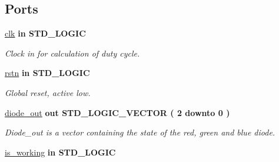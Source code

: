 \subsection*{Ports}
 \begin{DoxyCompactItemize}
\item 
\hypertarget{classRGB__diode__controller_a8120037e0ee47c35ba2d79242209c72e}{\hyperlink{classRGB__diode__controller_a8120037e0ee47c35ba2d79242209c72e}{clk}  {\bfseries {\bfseries \textcolor{vhdlkeyword}{in}\textcolor{vhdlchar}{ }}} {\bfseries \textcolor{comment}{S\-T\-D\-\_\-\-L\-O\-G\-I\-C}\textcolor{vhdlchar}{ }} }\label{classRGB__diode__controller_a8120037e0ee47c35ba2d79242209c72e}

\begin{DoxyCompactList}\small\item\em Clock in for calculation of duty cycle. \end{DoxyCompactList}\item 
\hypertarget{classRGB__diode__controller_aba021aec4b477b89079bb58ccadcc67e}{\hyperlink{classRGB__diode__controller_aba021aec4b477b89079bb58ccadcc67e}{rstn}  {\bfseries {\bfseries \textcolor{vhdlkeyword}{in}\textcolor{vhdlchar}{ }}} {\bfseries \textcolor{comment}{S\-T\-D\-\_\-\-L\-O\-G\-I\-C}\textcolor{vhdlchar}{ }} }\label{classRGB__diode__controller_aba021aec4b477b89079bb58ccadcc67e}

\begin{DoxyCompactList}\small\item\em Global reset, active low. \end{DoxyCompactList}\item 
\hypertarget{classRGB__diode__controller_a0ee3d978fb8b47588b62e4a768c780fe}{\hyperlink{classRGB__diode__controller_a0ee3d978fb8b47588b62e4a768c780fe}{diode\-\_\-out}  {\bfseries {\bfseries \textcolor{vhdlkeyword}{out}\textcolor{vhdlchar}{ }}} {\bfseries \textcolor{comment}{S\-T\-D\-\_\-\-L\-O\-G\-I\-C\-\_\-\-V\-E\-C\-T\-O\-R}\textcolor{vhdlchar}{ }\textcolor{vhdlchar}{(}\textcolor{vhdlchar}{ }\textcolor{vhdlchar}{ } \textcolor{vhdldigit}{2} \textcolor{vhdlchar}{ }\textcolor{vhdlchar}{ }\textcolor{vhdlchar}{ }\textcolor{vhdlkeyword}{downto}\textcolor{vhdlchar}{ }\textcolor{vhdlchar}{ }\textcolor{vhdlchar}{ } \textcolor{vhdldigit}{0} \textcolor{vhdlchar}{ }\textcolor{vhdlchar}{)}\textcolor{vhdlchar}{ }} }\label{classRGB__diode__controller_a0ee3d978fb8b47588b62e4a768c780fe}

\begin{DoxyCompactList}\small\item\em Diode\-\_\-out is a vector containing the state of the red, green and blue diode. \end{DoxyCompactList}\item 
\hypertarget{classRGB__diode__controller_a2027e6e92931979514fdb7cba1fa3b03}{\hyperlink{classRGB__diode__controller_a2027e6e92931979514fdb7cba1fa3b03}{is\-\_\-working}  {\bfseries {\bfseries \textcolor{vhdlkeyword}{in}\textcolor{vhdlchar}{ }}} {\bfseries \textcolor{comment}{S\-T\-D\-\_\-\-L\-O\-G\-I\-C}\textcolor{vhdlchar}{ }} }\label{classRGB__diode__controller_a2027e6e92931979514fdb7cba1fa3b03}


\end{DoxyCompactItemize}
